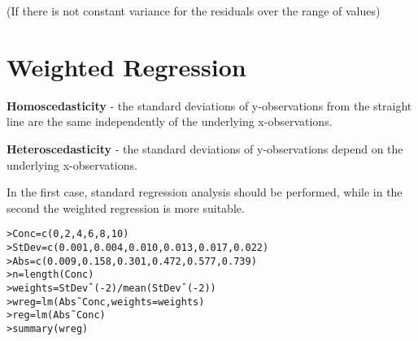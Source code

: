 \documentclass[a4paper,12pt]{article}
\begin{document}
(If there is not constant variance for the residuals over the range of values)


\section{Weighted Regression}

\textbf{Homoscedasticity} - the standard deviations of
y-observations from the straight line are the same independently
of the underlying x-observations.

\textbf{Heteroscedasticity} - the standard deviations of
y-observations depend on the underlying x-observations.

In the first case, standard regression analysis should be
performed, while in the second the weighted regression is more
suitable.

\begin{verbatim}
>Conc=c(0,2,4,6,8,10)
>StDev=c(0.001,0.004,0.010,0.013,0.017,0.022)
>Abs=c(0.009,0.158,0.301,0.472,0.577,0.739)
>n=length(Conc)
>weights=StDevˆ(-2)/mean(StDevˆ(-2))
>wreg=lm(Abs˜Conc,weights=weights)
>reg=lm(Abs˜Conc)
>summary(wreg)
\end{verbatim}
\end{document}
